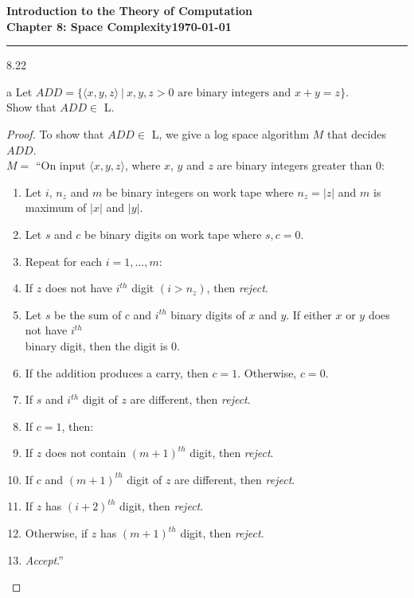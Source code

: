 \documentclass[11pt]{article}
\newcommand{\dated}{\today}
\begin{document}
\textbf{Introduction to the Theory of
Computation}\hfill\textbf{\myname}\\[0.01in]
\textbf{Chapter 8: Space Complexity}\hfill\textbf{\dated}\\
\smallskip\hrule\bigskip

\begin{problem}{8.22}
\end{problem}

\begin{problem}[Part]{a}
Let $ADD = \{\langle x, y, z \rangle \ | \ x, y, z > 0 \text{ are binary integers and } x + y = z\}$. \\ Show that $ADD \in$ L.
\end{problem}

\begin{proof}
To show that $ADD \in$ L, we give a log space algorithm $M$ that decides $ADD$. \\

$M =$ \textquotedblleft On input $\langle x, y, z \rangle$, where $x$, $y$ and $z$ are binary integers greater than 0:
\begin{enumerate}
\item Let $i$, $n_z$ and $m$ be binary integers on work tape where $n_z = |z|$ and $m$ is maximum of $|x|$ and $|y|$.
\item Let $s$ and $c$ be binary digits on work tape where $s, c = 0$.
\item Repeat for each $i = 1, \ldots, m$:
\item \hspace*{0.5cm} If $z$ does not have $i^{th}$ digit $(i > n_z)$, then \textit{reject}.
\item \hspace*{0.5cm} Let $s$ be the sum of $c$ and $i^{th}$ binary digits of $x$ and $y$. If either $x$ or $y$ does not have $i^{th}$ \\ \hspace*{0.5cm} binary digit, then the digit is 0. 
\item \hspace*{0.5cm} If the addition produces a carry, then $c = 1$. Otherwise, $c = 0$.
\item \hspace*{0.5cm} If $s$ and $i^{th}$ digit of $z$ are different, then \textit{reject}.
\item If $c = 1$, then:
\item \hspace*{0.5cm} If $z$ does not contain $(m+1)^{th}$ digit, then \textit{reject}.
\item \hspace*{0.5cm} If $c$ and $(m+1)^{th}$ digit of $z$ are different, then \textit{reject}.
\item \hspace*{0.5cm} If $z$ has $(i+2)^{th}$ digit, then \textit{reject}.
\item Otherwise, if $z$ has $(m+1)^{th}$ digit, then \textit{reject}. 
\item \textit{Accept}.\textquotedblright
\end{enumerate}
\end{proof}
\end{document}
